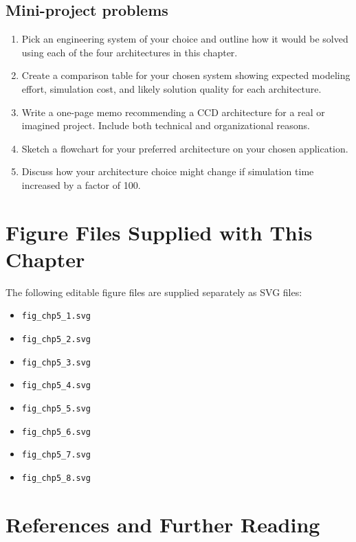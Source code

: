 \documentclass[11pt]{article}
\begin{document}
\subsection*{Mini-project problems}
\begin{enumerate}[leftmargin=1.5em,label=\textbf{P\arabic*.},resume]
  \item Pick an engineering system of your choice and outline how it would be solved using each of the four architectures in this chapter.
  \item Create a comparison table for your chosen system showing expected modeling effort, simulation cost, and likely solution quality for each architecture.
  \item Write a one-page memo recommending a CCD architecture for a real or imagined project. Include both technical and organizational reasons.
  \item Sketch a flowchart for your preferred architecture on your chosen application.
  \item Discuss how your architecture choice might change if simulation time increased by a factor of 100.
\end{enumerate}

\section{Figure Files Supplied with This Chapter}

The following editable figure files are supplied separately as SVG files:
\begin{itemize}[leftmargin=1.4em]
  \item \texttt{fig\_chp5\_1.svg}
  \item \texttt{fig\_chp5\_2.svg}
  \item \texttt{fig\_chp5\_3.svg}
  \item \texttt{fig\_chp5\_4.svg}
  \item \texttt{fig\_chp5\_5.svg}
  \item \texttt{fig\_chp5\_6.svg}
  \item \texttt{fig\_chp5\_7.svg}
  \item \texttt{fig\_chp5\_8.svg}
\end{itemize}

\section{References and Further Reading}
\end{document}
